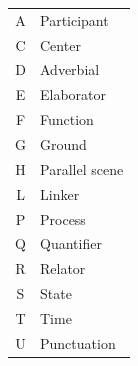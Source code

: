 \documentclass[extrafontsizes,60pt,twocolumn]{memoir}
\begin{document}
\hfill
\begin{minipage}{.13\columnwidth}
  \begin{adjustbox}{margin=.5in,frame,scale=.75,bgcolor=white}
  \begin{tabular}{>{\ttfamily}c@{\hskip 1in}l}
    A & Participant \\
    C & Center \\
    D & Adverbial \\
    E & Elaborator \\
    F & Function \\
    G & Ground \\
    H & Parallel scene \\
    L & Linker \\
    P & Process \\
    Q & Quantifier \\
    R & Relator \\
    S & State \\
    T & Time \\
    U & Punctuation
  \end{tabular}
  \end{adjustbox}
\end{minipage}
\end{document}
